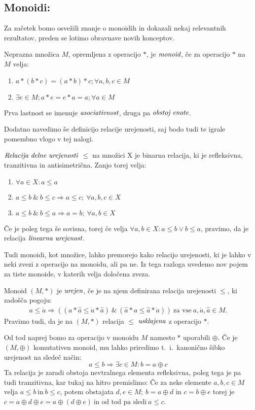 \documentclass[mat1]{fmfdelo}
\newcommand{\pojem}[1]{\ensuremath{\emph{#1}}}
\begin{document}
\subsection{Monoidi:}\label{subsect:monoid}
Za začetek bomo osvežili znanje o monoidih in dokazali nekaj relevantnih rezultatov, preden se lotimo obravnave novih konceptov. 
\begin{definicija}
	Neprazna množica $M$, opremljena z operacijo $\ast$, je \pojem{monoid}, če za operacijo $\ast$ na $M$ velja:
	\begin{enumerate}
		\item $a \ast (b \ast c) = (a\ast b) \ast c;\forall a, b, c \in M$
		\item $\exists e\in M; a \ast e = e\ast a = a;\forall a\in M$
	\end{enumerate}
	Prva lastnost se imenuje \pojem{asociativnost}, druga pa \pojem{obstoj enote}. 
\end{definicija}
Dodatno navedimo še definicijo relacije urejenosti, saj bodo tudi te igrale pomembno vlogo v tej nalogi.
\begin{definicija}
	\pojem{Relacija delne urejenosti} $\leq$ na množici X je binarna relacija, ki je refleksivna, tranzitivna in antisimetrična. Zanjo torej velja:
	\begin{enumerate}
		\item $\forall a \in X: a \leq a$
		\item $a\leq b~\&~b\leq c \Rightarrow a\leq c;~\forall a, b, c\in X$
		\item $a\leq b~\&~b\leq a \Rightarrow a = b;~\forall a, b\in X$
	\end{enumerate}
Če je poleg tega še sovisna, torej če velja $\forall a, b \in X: a \leq b \lor b \leq a$, pravimo, da je relacija \pojem{linearna urejenost}.
\end{definicija}
Tudi monoidi, kot množice, lahko premorejo kako relacijo urejenosti, ki je lahko v neki zvezi z operacijo na monoidu, ali pa ne. Iz tega razloga uvedemo nov pojem za tiste monoide, v katerih velja določena zveza.
\begin{definicija}
	Monoid $(M, \ast)$ je \pojem{urejen}, če je na njem definirana relacija urejenosti $\leq$, ki zadošča pogoju: \begin{align*} 
	a \leq \acute{a} \Rightarrow ((a \ast \hat{a} \leq \acute{a} \ast \hat{a})~\&~(\hat{a} \ast a \leq \hat{a}\ast \acute{a})) ~\text{za vse}~a, \acute{a},\hat{a}\in M.
\end{align*}
	Pravimo tudi, da je na $(M, \ast)$ relacija $\leq$ \pojem{usklajena} z operacijo $\ast$.
\end{definicija}
Od tod naprej bomo za operacijo v monoidu $M$ namesto $\ast$ uporabili $\oplus$.
Če je $(M, \oplus)$ komutativen monoid, mu lahko priredimo t.~i.~kanonično šibko urejenost na sledeč način: $$a \leq b \Rightarrow \exists c\in M: b = a \oplus c$$ Ta relacija je zaradi obstoja nevtralnega elementa refleksivna, poleg tega je pa tudi tranzitivna, kar tukaj na hitro premislimo: Če za neke elemente $a, b, c\in M$ velja $a\leq b~\text{in}~b\leq c$, potem obstajata $d, e\in M;~b = a \oplus d$ in $c = b\oplus e$ torej je $c = a\oplus d\oplus e = a\oplus (d \oplus e)~\text{in od tod pa sledi}~ a \leq c$.
	
\end{document}
